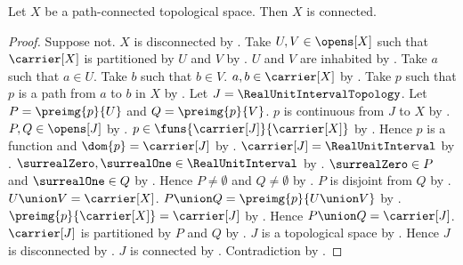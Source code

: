 \begin{theorem}\label{path_connected_implies_connected}
    Let $X$ be a path-connected topological space.
    Then $X$ is connected.
\end{theorem}
\begin{proof}
    Suppose not.
    $X$ is disconnected by .
    Take $U,V\in\opens[X]$ such that $\carrier[X]$ is partitioned by $U$ and $V$ by
        .
    $U$ and $V$ are inhabited by .
    Take $a$ such that $a\in U$.
    Take $b$ such that $b\in V$.
    $a,b\in\carrier[X]$ by .
    Take $p$ such that $p$ is a path from $a$ to $b$ in $X$ by .
    Let $J=\RealUnitIntervalTopology$.
    Let $P=\preimg{p}{U}$ and $Q=\preimg{p}{V}$.
    $p$ is continuous from $J$ to $X$ by .
    $P,Q\in\opens[J]$ by .
    $p\in\funs{\carrier[J]}{\carrier[X]}$ by .
    Hence $p$ is a function and $\dom{p}=\carrier[J]$ by .
    $\carrier[J]=\RealUnitInterval$ by .
    $\surrealZero,\surrealOne\in\RealUnitInterval$ by
        .
    $\surrealZero\in P$ and $\surrealOne\in Q$ by
        .
    Hence $P\neq\emptyset$ and $Q\neq\emptyset$ by \auto.
    $P$ is disjoint from $Q$ by .
    $U\union V=\carrier[X]$.
    $P\union Q=\preimg{p}{U\union V}$ by .
    $\preimg{p}{\carrier[X]}=\carrier[J]$ by .
    Hence $P\union Q=\carrier[J]$.
    $\carrier[J]$ is partitioned by $P$ and $Q$ by \auto.
    $J$ is a topological space by .
    Hence $J$ is disconnected by .
    $J$ is connected by .
    Contradiction by .
\end{proof}
